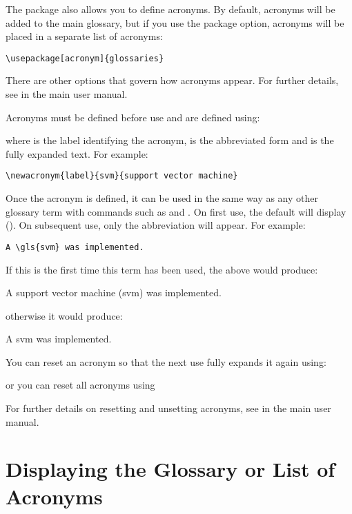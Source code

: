 \documentclass{nlctdoc}
\begin{document}
The  package also allows you to define acronyms.
By default, acronyms will be added to the main glossary, but if
you use the  package option, acronyms will be
placed in a separate list of acronyms:
\begin{verbatim}
\usepackage[acronym]{glossaries}
\end{verbatim}
There are other options that govern how acronyms appear. For further
details, see 
in the main  user manual.

Acronyms must be defined before use and are defined using:
\begin{definition}
\end{definition}
where  is the label identifying the acronym, 
is the abbreviated form and  is the fully expanded text.
For example:
\begin{verbatim}
\newacronym{label}{svm}{support vector machine}
\end{verbatim}

Once the acronym is defined, it can be used in the same way as 
any other glossary term with commands such as  and
. On first use, the default will display 
(). On subsequent use, only the abbreviation will
appear. For example:
\begin{verbatim}
A \gls{svm} was implemented.
\end{verbatim}
If this is the first time this term has been used, the above would 
produce:
\begin{display}
A support vector machine (svm) was implemented.
\end{display}
otherwise it would produce:
\begin{display}
A svm was implemented.
\end{display}
You can reset an acronym so that the next use fully 
expands it again using:
\begin{definition}
\end{definition}
or you can reset all acronyms using
\begin{definition}
\end{definition}
For further details on resetting and unsetting acronyms, see
in the main  user manual.

\section{Displaying the Glossary or List of Acronyms}
\label{printglossaries}
\end{document}
